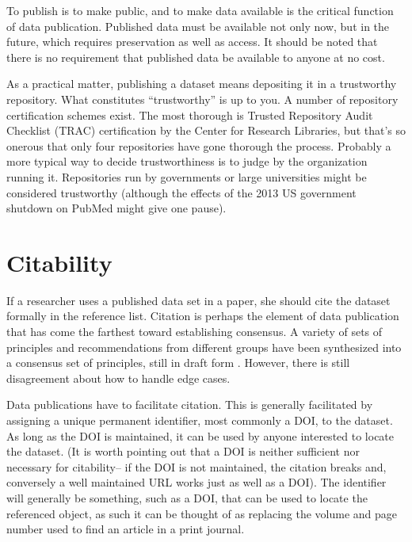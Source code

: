 \documentclass[10pt,a4paper,twocolumn]{article}
\begin{document}
To publish is to make public, and to make data available is the critical function of data publication. 
Published data must be available not only now, but in the future, which requires preservation as well as access. 
It should be noted that there is no requirement that published data be available to anyone at no cost.

As a practical matter, publishing a dataset means depositing it in a trustworthy repository. 
What constitutes ``trustworthy'' is up to you. 
A number of repository certification schemes exist. The most thorough is Trusted Repository Audit Checklist (TRAC)\cite{trac_2007} certification by the Center for Research Libraries, but that's so onerous that only four repositories have gone thorough the process. 
Probably a more typical way to decide trustworthiness is to judge by the organization running it. 
Repositories run by governments or large universities might be considered trustworthy (although the effects of the 2013 US government shutdown on PubMed might give one pause).


\section*{Citability}\label{citability}

If a researcher uses a published data set in a paper, she should cite the dataset formally in the reference list. 
Citation is perhaps the element of data publication that has come the farthest toward establishing consensus.
A variety of sets of principles and recommendations from different groups have been synthesized into a consensus set of principles, still in draft form \cite{force11_data_2013}. 
However, there is still disagreement about how to handle edge cases.

Data publications have to facilitate citation. 
This is generally facilitated by assigning a unique permanent identifier, most commonly a DOI, to the dataset. 
As long as the DOI is maintained, it can be used by anyone interested to locate the dataset. 
(It is worth pointing out that a DOI is neither sufficient nor necessary for citability-- if the DOI is not maintained, the citation breaks and, conversely a well maintained URL works just as well as a DOI). 
The identifier will generally be something, such as a DOI, that can be used to locate the referenced object, as such it can be thought of as replacing the volume and page number used to find an article in a print journal.
\end{document}
